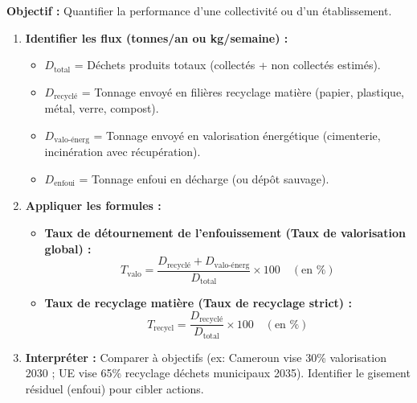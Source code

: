 \documentclass[11pt]{article}
\begin{document}
\begin{methode}
\textbf{Objectif :} Quantifier la performance d'une collectivité ou d'un établissement.
\begin{enumerate}
    \item \textbf{Identifier les flux (tonnes/an ou kg/semaine) :}
    \begin{itemize}
        \item $D_{\text{total}}$ = Déchets produits totaux (collectés + non collectés estimés).
        \item $D_{\text{recyclé}}$ = Tonnage envoyé en filières recyclage matière (papier, plastique, métal, verre, compost).
        \item $D_{\text{valo-énerg}}$ = Tonnage envoyé en valorisation énergétique (cimenterie, incinération avec récupération).
        \item $D_{\text{enfoui}}$ = Tonnage enfoui en décharge (ou dépôt sauvage).
    \end{itemize}
    \item \textbf{Appliquer les formules :}
    \begin{itemize}
        \item \textbf{Taux de détournement de l'enfouissement (Taux de valorisation global) :}
        \[ T_{\text{valo}} = \frac{D_{\text{recyclé}} + D_{\text{valo-énerg}}}{D_{\text{total}}} \times 100 \quad (\text{en \%}) \]
        \item \textbf{Taux de recyclage matière (Taux de recyclage strict) :}
        \[ T_{\text{recycl}} = \frac{D_{\text{recyclé}}}{D_{\text{total}}} \times 100 \quad (\text{en \%}) \]
    \end{itemize}
    \item \textbf{Interpréter :} Comparer à objectifs (ex: Cameroun vise 30\% valorisation 2030 ; UE vise 65\% recyclage déchets municipaux 2035). Identifier le gisement résiduel (enfoui) pour cibler actions.
\end{enumerate}
\end{methode}
\end{document}
